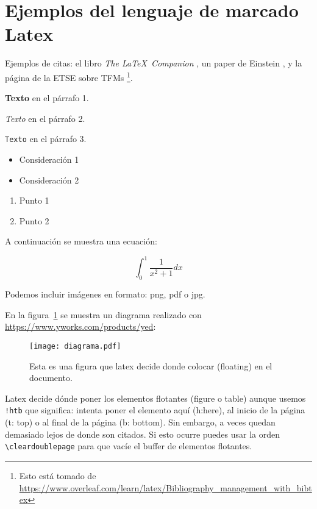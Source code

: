 \section{Ejemplos del lenguaje de marcado Latex}

Ejemplos de citas: el libro \textit{The \LaTeX\ Companion}
\cite{latexcompanion}, un paper de Einstein \cite{einstein},
y la página de la ETSE sobre TFMs \cite{ETSE:online}\footnote{Esto está tomado de
\url{https://www.overleaf.com/learn/latex/Bibliography_management_with_bibtex}}.


  \textbf{Texto} en el párrafo 1.

  \textit{Texto} en el párrafo 2.

  \texttt{Texto} en el párrafo 3.


  \begin{itemize}
  \item Consideración 1
  \item Consideración 2
  \end{itemize}

  \vspace{0.5cm}

  \begin{enumerate}
  \item Punto 1
  \item Punto 2
  \end{enumerate}

A continuación se muestra una ecuación:

  \[ \int_{0}^{1}\frac{1}{x^2+1} dx \]

  Podemos incluir imágenes en formato: png, pdf o jpg.

  En la figura~\ref{fig:diagrama} se muestra un diagrama realizado con \href{yed}{https://www.yworks.com/products/yed}:

  \begin{figure}[!htb]
    \texttt{[image: diagrama.pdf]}
    \caption{Esta es una figura que latex decide donde colocar (floating) en el documento.}
    \label{fig:diagrama}
    \end{figure}

    Latex decide dónde poner los elementos flotantes (figure o table)
    aunque usemos \verb#!htb# que significa: intenta poner el elemento
    aquí (h:here), al inicio de la página (t: top) o al final de la
    página (b: bottom). Sin embargo, a veces quedan demasiado lejos de
    donde son citados. Si esto ocurre puedes usar la orden
    \verb#\cleardoublepage# para que vacíe el buffer de elementos flotantes.

